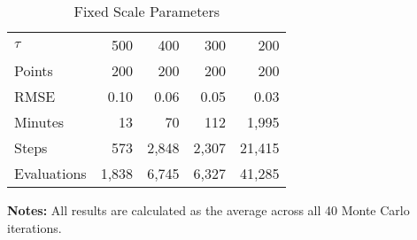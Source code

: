\begin{table}\onehalfspacing
\begin{center}
\begin{threeparttable}
  \captionsetup{width=30cm}
  \caption{Fixed Scale Parameters}
  \label{Fixed Scale Parameters}
  \begin{tabular}{lrrrr}\toprule
  $\tau$ & 500 &  400 &   300 & 200 \\
  Points      & 200 & 200 & 200  & 200 \\
  \midrule
  RMSE        & 0.10 &   0.06 &    0.05 &  0.03  \\
  Minutes     &  13 &      70 &    112 &   1,995 \\
  Steps       &  573 &   2,848 &    2,307 &  21,415 \\
  Evaluations & 1,838 &   6,745 &    6,327 &  41,285 \\
  \bottomrule
  \end{tabular}\scriptsize
  \begin{tablenotes}\item \textbf{Notes:} All results are calculated as the average across all 40 Monte Carlo iterations.
\end{tablenotes}
  \end{threeparttable}
  \end{center}
\end{table}
